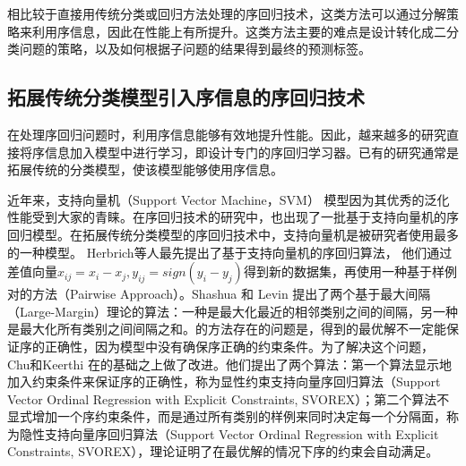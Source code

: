 相比较于直接用传统分类或回归方法处理的序回归技术，这类方法可以通过分解策略来利用序信息，因此在性能上有所提升。这类方法主要的难点是设计转化成二分类问题的策略，以及如何根据子问题的结果得到最终的预测标签。

\subsection{拓展传统分类模型引入序信息的序回归技术}
在处理序回归问题时，利用序信息能够有效地提升性能。因此，越来越多的研究直接将序信息加入模型中进行学习，即设计专门的序回归学习器。已有的研究通常是拓展传统的分类模型，使该模型能够使用序信息。

近年来，支持向量机（Support Vector Machine，SVM\citep{cortes1995support}）
模型因为其优秀的泛化性能受到大家的青睐。在序回归技术的研究中，也出现了一批基于支持向量机的序回归模型。在拓展传统分类模型的序回归技术中，支持向量机是被研究者使用最多的一种模型。 Herbrich等人\citep{herbrich1999support}\citep{herbrich1999large}最先提出了基于支持向量机的序回归算法，
他们通过差值向量\(x_{ij} = x_{i}-x_{j}, y_{ij} = sign(y_{i} - y_{j})\)得到新的数据集，再使用一种基于样例对的方法（Pairwise Approach）。Shashua 和 Levin\citep{shashua2002ranking}
提出了两个基于最大间隔（Large-Margin）理论的算法：一种是最大化最近的相邻类别之间的间隔，另一种是最大化所有类别之间间隔之和。\citep{shashua2002ranking}的方法存在的问题是，得到的最优解不一定能保证序的正确性，因为模型中没有确保序正确的约束条件。为了解决这个问题， Chu和Keerthi\citep{chu2007support}\citep{chu2005new}
在\citep{shashua2002ranking}的基础之上做了改进。他们提出了两个算法：第一个算法显示地加入约束条件来保证序的正确性，称为显性约束支持向量序回归算法（Support Vector Ordinal Regression with Explicit Constraints, SVOREX）；第二个算法不显式增加一个序约束条件，而是通过所有类别的样例来同时决定每一个分隔面，称为隐性支持向量序回归算法（Support Vector Ordinal Regression with Explicit Constraints, SVOREX），\citep{chu2007support}理论证明了在最优解的情况下序的约束会自动满足。

